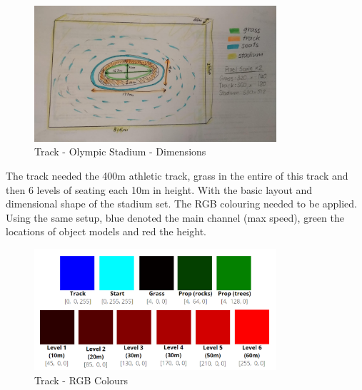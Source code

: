 \documentclass[a4 paper, 12pt]{article}
\begin{document}
\begin{figure} [H]
    \centering
    \includegraphics[width=0.8\textwidth, frame]
        {./images/olympics/track_dimensions.jpg}  
    \caption{Track - Olympic Stadium - Dimensions}   
\end{figure}

The track needed the 400m athletic track, grass in the entire of this track and then 6 levels of seating each 10m in height. With the basic layout and dimensional shape of the stadium set. The RGB colouring needed to be applied. Using the same setup, blue denoted the main channel (max speed), green the locations of object models and red the height.
    \begin{figure} [H]
        \centering
        \includegraphics[width=0.8\textwidth, frame]
            {./images/olympics/track_colours.PNG}  
        \caption{Track - RGB Colours}   
    \end{figure}
\end{document}
